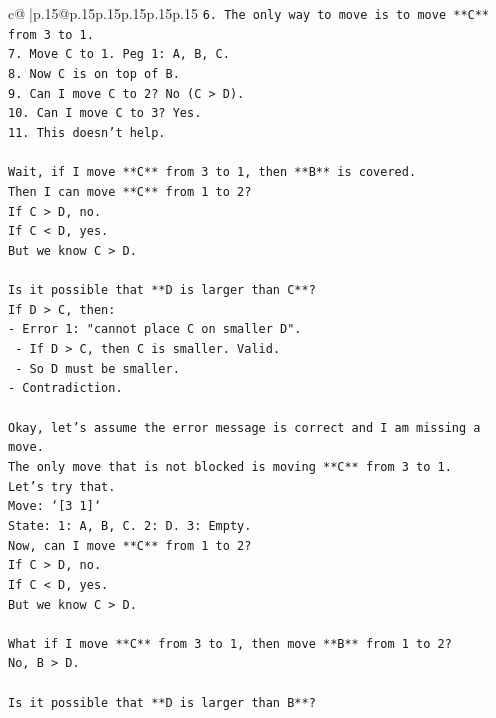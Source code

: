 \documentclass{article}
\begin{document}
{\begin{supertabular}{c@{$\;$}|p{.15\linewidth}@{}p{.15\linewidth}p{.15\linewidth}p{.15\linewidth}p{.15\linewidth}p{.15\linewidth}}
{{{\texttt{6. The only way to move is to move **C** from 3 to 1.} \\
\texttt{7. Move C to 1. Peg 1: A, B, C.} \\
\texttt{8. Now C is on top of B.} \\
\texttt{9. Can I move C to 2? No (C > D).} \\
\texttt{10. Can I move C to 3? Yes.} \\
\texttt{11. This doesn't help.} \\
\\ 
\texttt{Wait, if I move **C** from 3 to 1, then **B** is covered.} \\
\texttt{Then I can move **C** from 1 to 2?} \\
\texttt{If C > D, no.} \\
\texttt{If C < D, yes.} \\
\texttt{But we know C > D.} \\
\\ 
\texttt{Is it possible that **D is larger than C**?} \\
\texttt{If D > C, then:} \\
\texttt{{-} Error 1: "cannot place C on smaller D".} \\
\texttt{    {-} If D > C, then C is smaller. Valid.} \\
\texttt{    {-} So D must be smaller.} \\
\texttt{{-} Contradiction.} \\
\\ 
\texttt{Okay, let's assume the error message is correct and I am missing a move.} \\
\texttt{The only move that is not blocked is moving **C** from 3 to 1.} \\
\texttt{Let's try that.} \\
\texttt{Move: `{[}3 1{]}`} \\
\texttt{State: 1: A, B, C. 2: D. 3: Empty.} \\
\texttt{Now, can I move **C** from 1 to 2?} \\
\texttt{If C > D, no.} \\
\texttt{If C < D, yes.} \\
\texttt{But we know C > D.} \\
\\ 
\texttt{What if I move **C** from 3 to 1, then move **B** from 1 to 2?} \\
\texttt{No, B > D.} \\
\\ 
\texttt{Is it possible that **D is larger than B**?} \\
}}}
\end{supertabular}}
\end{document}

